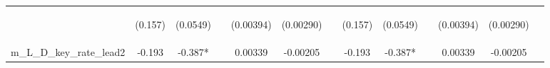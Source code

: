 \documentclass[]{article}
\begin{document}
\begin{center}
\begin{tabular}{lcccccccccccc}
\vspace{4pt} & \begin{footnotesize}(0.157)\end{footnotesize} & \begin{footnotesize}(0.0549)\end{footnotesize} & \begin{footnotesize}\end{footnotesize} & \begin{footnotesize}(0.00394)\end{footnotesize} & \begin{footnotesize}(0.00290)\end{footnotesize} & \begin{footnotesize}\end{footnotesize} & \begin{footnotesize}(0.157)\end{footnotesize} & \begin{footnotesize}(0.0549)\end{footnotesize} & \begin{footnotesize}\end{footnotesize} & \begin{footnotesize}(0.00394)\end{footnotesize} & \begin{footnotesize}(0.00290)\end{footnotesize} & \begin{footnotesize}\end{footnotesize} \\
m\_L\_D\_key\_rate\_lead2 & -0.193 & -0.387* &  & 0.00339 & -0.00205 &  & -0.193 & -0.387* &  & 0.00339 & -0.00205 &  \\

\end{tabular}
\end{center}
\end{document}
